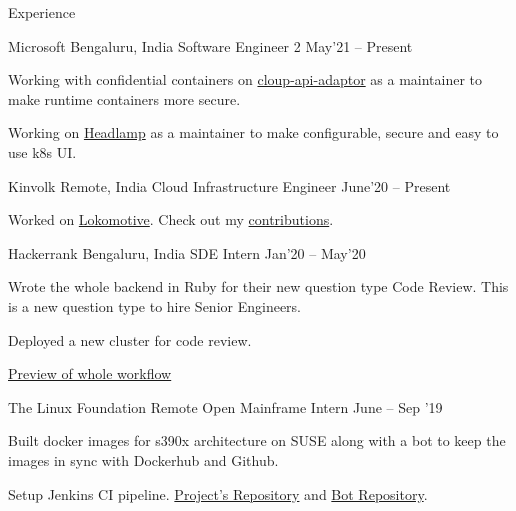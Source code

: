 \documentclass{resume} %
\begin{document}
\begin{rSection}{Experience}

  \begin{rWorkSection}{Microsoft}
                     {Bengaluru, India}
                     {Software Engineer 2}
                     {May'21 -- Present} {
    \item Working with confidential containers on \href{http://github.com/confidential-containers/cloud-api-adaptor/}{cloup-api-adaptor} as a maintainer to make runtime containers more secure.
    \item Working on \href{https://github.com/headlamp-k8s/headlamp}{Headlamp} as a maintainer to make configurable, secure and easy to use k8s UI.
  }
  \end{rWorkSection}

  \begin{rWorkSection}{Kinvolk}
                     {Remote, India}
                     {Cloud Infrastructure Engineer}
                     {June'20 -- Present} {
    \item Worked on \href{https://github.com/kinvolk/lokomotive}{Lokomotive}. Check out my \href{https://bit.ly/3fuHP1L}{contributions}.
  }
  \end{rWorkSection}

  \begin{rWorkSection}{Hackerrank}
                     {Bengaluru, India}
                     {SDE Intern}
                     {Jan'20 -- May'20} {
    \item Wrote the whole backend in Ruby for their new question type Code Review. This is a new question type to hire Senior Engineers. 
    \item Deployed a new cluster for code review.
    \item \href{https://drive.google.com/file/d/1o1cM7VUnvcKaShnM1XLyEChmaIrFrKEh/view}{Preview of whole workflow}
  }
  \end{rWorkSection}

  \begin{rWorkSection}{The Linux Foundation}
                           {Remote}
                           {Open Mainframe Intern}
                           {June -- Sep '19}
  {
    \item Built docker images for s390x architecture on SUSE along with a bot to keep the images in sync with Dockerhub and Github.   
    \item Setup Jenkins CI pipeline. \href{https://github.com/openmainframeproject-internship/DockerHub-Development-Stacks/}{Project's Repository} and \href{https://github.com/knrt10/docker-hub-development-stacks-bot/}{Bot Repository}.  
  }                         
  \end{rWorkSection}


\end{rSection}
\end{document}
